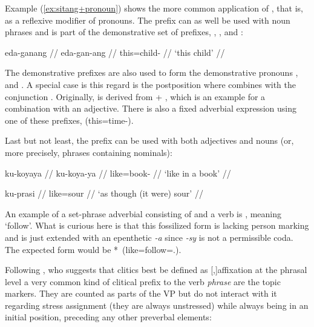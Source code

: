 \label{nounprefixes}
Example (\ref{ex:sitang+pronoun}) shows the more common application of 
, that is, as a reflexive modifier of pronouns. The 
prefix  can as well be used with noun phrases and is part of the 
demonstrative set of prefixes, , , 
and :

\ex\begingl
	\gla eda-ganang //
	\glb eda-gan-ang //
	\glc this=child-\Aarg{} //
	\glft `this child' //
\endgl\xe

The demonstrative prefixes are also used to form the demonstrative 
pronouns , 
 and . A special case 
is this regard is the postposition  where  combines with the conjunction 
. Originally, 
 is derived from  + 
, which is an example for a combination 
with an adjective. There is also a fixed adverbial expression using one of 
these prefixes,  
(this=time-\Dat{}).

Last but not least, the prefix  can be used 
with both adjectives and nouns (or, more precisely, phrases containing 
nominals):

\pex
\a\begingl
	\gla ku-koyaya //
	\glb ku-koya-ya //
	\glc like=book-\Loc{} //
	\glft `like in a book' //
\endgl

\a\begingl
	\gla ku-prasi //
	\glb like=sour //
	\glft `as though (it were) sour' //
\endgl
\xe

An example of a set-phrase adverbial consisting of  and a verb 
is ,  meaning `follow'. 
What is curious here is that this fossilized form is lacking person marking 
and is just extended with an epenthetic \textit{-a} since \textit{-sy} is not 
a permissible coda. The expected form would be 
*\, (like=follow=\TsgI{}.\Aarg{}).

Following \citet{klavans1985}, who suggests that clitics best be defined as 
[,]{affixation at the phrasal level} a very common 
kind of clitical prefix to the verb \emph{phrase} are the topic markers. They 
are counted as parts of the VP but do not interact with it regarding stress 
assignment (they are always unstressed) while always being in an initial 
position, preceding any other preverbal elements:

